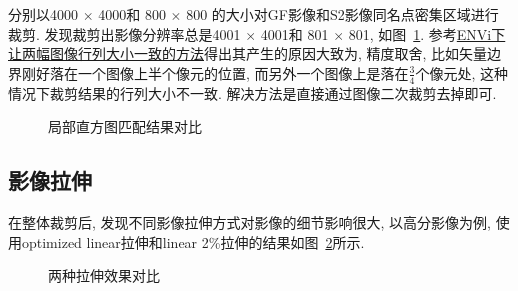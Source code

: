 分别以4000 $\times$ 4000和 800 $\times$ 800 的大小对GF影像和S2影像同名点密集区域进行裁剪. 发现裁剪出影像分辨率总是4001 $\times$ 4001和 801 $\times$ 801, 如图~\ref{fig:0212}. 参考\href{http://blog.sina.com.cn/s/blog_764b1e9d01016zgd.html}{ENVi下让两幅图像行列大小一致的方法}得出其产生的原因大致为, 精度取舍, 比如矢量边界刚好落在一个图像上半个像元的位置, 而另外一个图像上是落在$\frac{3}{4}$个像元处, 这种情况下裁剪结果的行列大小不一致. 解决方法是直接通过图像二次裁剪去掉即可.

\begin{figure}[!htbp]
    \centering
    \qquad
    \caption{局部直方图匹配结果对比}
    \label{fig:0212}
\end{figure}

\subsection{影像拉伸}

在整体裁剪后, 发现不同影像拉伸方式对影像的细节影响很大, 以高分影像为例, 使用optimized linear拉伸和linear 2\%拉伸的结果如图~\ref{fig:0213}所示.

\begin{figure}[!htbp]
    \centering
    \qquad
    \caption{两种拉伸效果对比}
    \label{fig:0213}
\end{figure}

